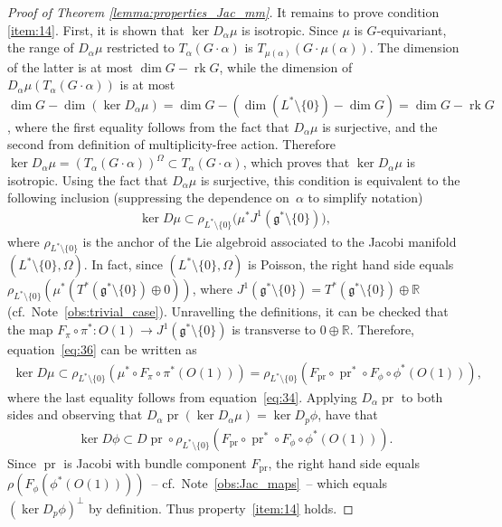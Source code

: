 \documentclass[10pt,a4paper]{amsart}
\numberwithin{equation}{section}
\newcommand{\CM}{(M,H)} %
\newcommand{\SYM}{L^* \setminus \{0\}} %
\newcommand{\RR}{\mathbb{R}}
\begin{document}
\begin{proof}[Proof of Theorem \ref{lemma:properties_Jac_mm}]
It remains to prove condition \ref{item:14}. First, it is shown that $\ker D_{\alpha}\mu$ is isotropic. Since $\mu $ is $G$-equivariant, the range of $D_{\alpha} \mu$ restricted to $T_{\alpha}(G \cdot \alpha)$ is $T_{\mu(\alpha)} (G \cdot \mu(\alpha))$. The dimension of the latter is at most $\dim G - \operatorname{rk} G$, while the dimension of $D_{\alpha} \mu (T_{\alpha} (G \cdot \alpha))$ is at most $\dim G - \dim (\ker D_{\alpha}\mu) = \dim G - (\dim (L^* \setminus \{0\}) - \dim G) = \dim G - \operatorname{rk} G$, where the f\/irst equality follows from the fact that $D_{\alpha}\mu$ is surjective, and the second from def\/inition of multiplicity-free action. Therefore $\ker D_{\alpha} \mu =(T_{\alpha} (G \cdot \alpha))^{\Omega} \subset T_{\alpha}(G \cdot \alpha)$, which proves that $\ker D_{\alpha} \mu$ is isotropic. Using the fact that $D_{\alpha} \mu$ is surjective, this condition is equivalent to the following inclusion (suppressing the dependence on~$\alpha$ to simplify notation)
\begin{gather} \label{eq:36}
 \ker D \mu \subset \rho_{L^{*} \setminus \{0\}} \big(\mu^*J^1(\mathfrak{g}^* \setminus \{0\})\big),
\end{gather}
where $\rho_{L^{*} \setminus \{0\}}$ is the anchor of the Lie algebroid associated to the Jacobi manifold $(\SYM,\Omega)$. In fact, since
$(\SYM,\Omega)$ is Poisson, the right hand side equals $ \rho_{L^{*} \setminus \{0\}} (\mu^*( T^*(\mathfrak{g}^* \setminus \{0\}) \oplus 0))$, where $J^1(\mathfrak{g}^* \setminus \{0\}) = T^*(\mathfrak{g}^* \setminus \{0\}) \oplus \RR$ (cf.\ Note~\ref{obs:trivial_case}). Unravelling the def\/initions, it can be checked that the map $F_{\pi} \circ \pi^* \colon O(1) \to J^1(\mathfrak{g}^* \setminus \{0\})$ is transverse to $0 \oplus \RR$. Therefore, equation~\eqref{eq:36} can be written as
\begin{gather*}
 \ker D \mu \subset \rho_{L^{*} \setminus \{0\}} (\mu^*\circ F_{\pi} \circ \pi^*(O(1)))= \rho_{L^{*} \setminus \{0\}}(F_{\operatorname{pr}} \circ
 \operatorname{pr}^* \circ F_{\phi} \circ \phi^*(O(1)) ),
\end{gather*}
where the last equality follows from equation~\eqref{eq:34}. Applying $D_{\alpha} \operatorname{pr}$ to both sides and observing that $D_{\alpha} \operatorname{pr} (\ker D_{\alpha} \mu) = \ker D_p \phi$, have that
 \begin{gather*}
 \ker D \phi \subset D \operatorname{pr} \circ \rho_{L^{*} \setminus \{0\}} (F_{\operatorname{pr}} \circ \operatorname{pr}^* \circ F_{\phi} \circ \phi^*(O(1)) ).
 \end{gather*}
Since $\operatorname{pr}$ is Jacobi with bundle component $F_{\operatorname{pr}}$, the right hand side equals
 $\rho(F_{\phi}(\phi^*(O(1))))$~-- cf.\ Note~\ref{obs:Jac_maps}~-- which equals $(\ker D_p \phi)^{\perp}$ by def\/inition. Thus property~\ref{item:14} holds.
\end{proof}
\end{document}
